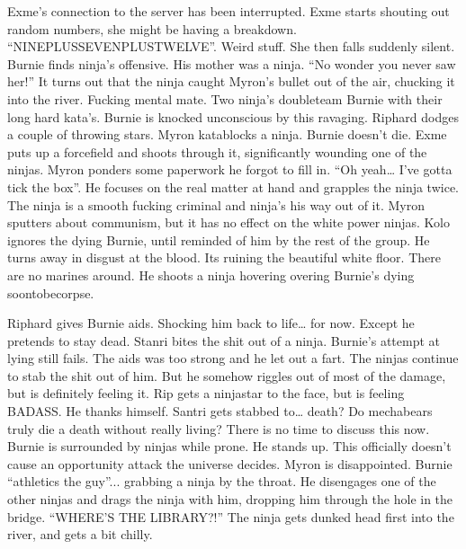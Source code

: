 \begin{multicols}{2}
Exme’s connection to the server has been interrupted. Exme starts shouting out random numbers, she might be having a breakdown. “NINEPLUSSEVENPLUSTWELVE”. Weird stuff. She then falls suddenly silent. Burnie finds ninja’s offensive. His mother was a ninja. “No wonder you never saw her!” It turns out that the ninja caught Myron’s bullet out of the air, chucking it into the river. Fucking mental mate. Two ninja’s doubleteam Burnie with their long hard kata’s. Burnie is knocked unconscious by this ravaging. Riphard dodges a couple of throwing stars. Myron katablocks a ninja. Burnie doesn’t die. Exme puts up a forcefield and shoots through it, significantly wounding one of the ninjas. Myron ponders some paperwork he forgot to fill in. “Oh yeah… I’ve gotta tick the box”. He focuses on the real matter at hand and grapples the ninja twice. The ninja is a smooth fucking criminal and ninja’s his way out of it. Myron sputters about communism, but it has no effect on the white power ninjas. Kolo ignores the dying Burnie, until reminded of him by the rest of the group. He turns away in disgust at the blood. Its ruining the beautiful white floor. There are no marines around. He shoots a ninja hovering overing Burnie’s dying soontobecorpse.\medskip

Riphard gives Burnie aids. Shocking him back to life… for now. Except he pretends to stay dead. Stanri bites the shit out of a ninja. Burnie’s attempt at lying still fails. The aids was too strong and he let out a fart. The ninjas continue to stab the shit out of him. But he somehow riggles out of most of the damage, but is definitely feeling it. Rip gets a ninjastar to the face, but is feeling BADASS. He thanks himself. Santri gets stabbed to… death? Do mechabears truly die a death without really living? There is no time to discuss this now. Burnie is surrounded by ninjas while prone. He stands up. This officially doesn’t cause an opportunity attack the universe decides. Myron is disappointed. Burnie “athletics the guy”... grabbing a ninja by the throat. He disengages one of the other ninjas and drags the ninja with him, dropping him through the hole in the bridge. “WHERE’S THE LIBRARY?!” The ninja gets dunked head first into the river, and gets a bit chilly.\medskip


\end{multicols}
